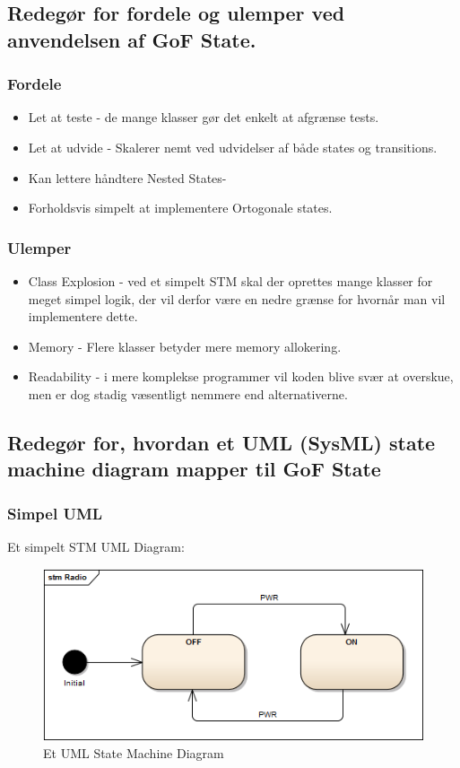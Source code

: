 \subsection{Redegør for fordele og ulemper ved anvendelsen af GoF State.}

\subsubsection{Fordele}
\begin{itemize}
	\item Let at teste - de mange klasser gør det enkelt at afgrænse tests.
	\item Let at udvide - Skalerer nemt ved udvidelser af både states og transitions.
	\item Kan lettere håndtere Nested States-
	\item Forholdsvis simpelt at implementere Ortogonale states.
\end{itemize}

\subsubsection{Ulemper}
\begin{itemize}
	\item Class Explosion - ved et simpelt STM skal der oprettes mange klasser for meget simpel logik, der vil derfor være en nedre grænse for hvornår man vil implementere dette.
	\item Memory - Flere klasser betyder mere memory allokering.
	\item Readability - i mere komplekse programmer vil koden blive svær at overskue, men er dog stadig væsentligt nemmere end alternativerne.
\end{itemize}


\subsection{Redegør for, hvordan et UML (SysML) state machine diagram mapper til GoF State}
\subsubsection{Simpel UML}

Et simpelt STM UML Diagram:

\begin{figure}[H]
	\centering
	\includegraphics[width=0.8\linewidth]{figs/state/Radio_STM_Simpel}
	\caption{Et UML State Machine Diagram}
	\label{fig:UMLState}
\end{figure}

